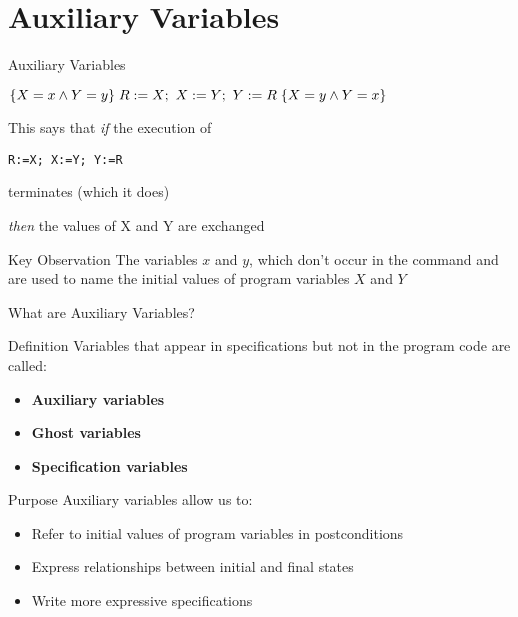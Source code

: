 \section{Auxiliary Variables}

\begin{frame}{Auxiliary Variables}
    \begin{example}
        $\hoare{X=x \wedge Y=y}{R:=X;\ X:=Y;\ Y:=R}{X=y \wedge Y=x}$
        
        This says that \emph{if} the execution of
        \begin{center}
            \texttt{R:=X; X:=Y; Y:=R}
        \end{center}
        terminates (which it does)
        
        \emph{then} the values of X and Y are exchanged
    \end{example}
    
    \begin{block}{Key Observation}
        The variables $x$ and $y$, which don't occur in the command and are used to name the initial values of program variables $X$ and $Y$
    \end{block}
\end{frame}

\begin{frame}{What are Auxiliary Variables?}
    \begin{block}{Definition}
        Variables that appear in specifications but not in the program code are called:
        \begin{itemize}
            \item \textbf{Auxiliary variables}
            \item \textbf{Ghost variables}
            \item \textbf{Specification variables}
        \end{itemize}
    \end{block}
    
    \begin{block}{Purpose}
        Auxiliary variables allow us to:
        \begin{itemize}
            \item Refer to initial values of program variables in postconditions
            \item Express relationships between initial and final states
            \item Write more expressive specifications
        \end{itemize}
    \end{block}
\end{frame}

